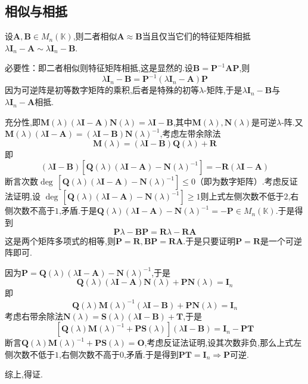 \subsection{相似与相抵}
\begin{formal}
\begin{theorem}[相似与相抵]\label{thm:相似与相抵}
    设$\bm{A},\bm{B}\in M_n\left(\mathbb{K}\right)$,则二者相似$\bm{A}\approx  \bm{B}$当且仅当它们的特征矩阵相抵$\lambda\bm{I}_n-\bm{A}\sim\lambda\bm{I}_n-\bm{B}.$
\end{theorem}
\begin{Proof}
必要性：即二者相似则特征矩阵相抵,这是显然的.设$\bm{B}=\bm{P}^{-1}\bm{AP}$,则\[
\lambda\bm{I}_n-\bm{B}=\bm{P}^{-1}\left(\lambda\bm{I}_n-\bm{A}\right)\bm{P}
\]因为可逆阵是初等数字矩阵的乘积,后者是特殊的初等$\lambda$-矩阵,于是$\lambda\bm{I}_n-\bm{B}$与$\lambda\bm{I}_n-\bm{A}$相抵.

充分性,即$\bm{M}\left(\lambda\right)\left(\lambda\bm{I}-\bm{A}\right)\bm{N}\left(\lambda\right)=\lambda\bm{I}-\bm{B}$,其中$\bm{M}\left(\lambda\right),\bm{N}\left(\lambda\right)$是可逆$\lambda$-阵.又
$\bm{M}\left(\lambda\right)\left(\lambda\bm{I}-\bm{A}\right)=\left(\lambda\bm{I}-\bm{B}\right)\bm{N}\left(\lambda\right)^{-1}$,考虑左带余除法\[
\bm{M}\left(\lambda\right)=\left(\lambda\bm{I}-\bm{B}\right)\bm{Q}\left(\lambda\right)+\bm{R}
\]即\[
\left(\lambda\bm{I}-\bm{B}\right)\left[
    \bm{Q}\left(\lambda\right)\left(\lambda\bm{I}-\bm{A}\right)-\bm{N}\left(\lambda\right)^{-1}
\right]=-\bm{R}\left(\lambda\bm{I}-\bm{A}\right)
\]断言次数$\deg\,\left[
    \bm{Q}\left(\lambda\right)\left(\lambda\bm{I}-\bm{A}\right)-\bm{N}\left(\lambda\right)^{-1}
\right]\leqslant 0$（即为数字矩阵）.考虑反证法证明,设
$\deg\,
\left[
    \bm{Q}\left(\lambda\right)\left(\lambda\bm{I}-\bm{A}\right)-\bm{N}\left(\lambda\right)^{-1}
\right]\geqslant 1
$则上式左侧次数不低于$2$,右侧次数不高于$1$,矛盾.于是$\bm{Q}\left(\lambda\right)\left(\lambda\bm{I}-\bm{A}\right)-\bm{N}\left(\lambda\right)^{-1}=-\bm{P}\in M_n\left(\mathbb{K}\right)$.于是得到
\[
\bm{P}\lambda-\bm{BP}=\bm{R}\lambda-\bm{RA}
\]这是两个矩阵多项式的相等,则$\bm{P}=\bm{R},\bm{BP}=\bm{RA}$.于是只要证明$\bm{P}=\bm{R}$是一个可逆阵即可.

因为$\bm{P}=
\bm{Q}\left(\lambda\right)\left(\lambda\bm{I}-\bm{A}\right)-\bm{N}\left(\lambda\right)^{-1}
$,于是
\[
\bm{Q}\left(\lambda\right)\left(\lambda\bm{I}-\bm{A}\right)\bm{N}\left(\lambda\right)+\bm{P}\bm{N}\left(\lambda\right)=\bm{I}_n
\]即
\[
\bm{Q}\left(\lambda\right)\bm{M}\left(\lambda\right)^{-1}\left(\lambda\bm{I}-\bm{B}\right)+\bm{P}\bm{N}\left(\lambda\right)=\bm{I}_n
\]考虑右带余除法$\bm{N}\left(\lambda\right)=\bm{S}\left(\lambda\right)\left(\lambda\bm{I}-\bm{B}\right)+\bm{T}$,于是
\[
\left[
    \bm{Q}\left(\lambda\right)\bm{M}\left(\lambda\right)^{-1}+\bm{PS}\left(\lambda\right)
\right]\left(\lambda\bm{I}-\bm{B}\right)=\bm{I}_n-\bm{PT}
\]断言$\bm{Q}\left(\lambda\right)\bm{M}\left(\lambda\right)^{-1}+\bm{PS}\left(\lambda\right)=\bm{O}$,考虑反证法证明,设其次数非负,那么上式左侧次数不低于$1$,右侧次数不高于$0$,矛盾.于是得到$\bm{PT}=\bm{I}_n\Longrightarrow \bm{P}$可逆.

综上,得证.
\end{Proof}
\end{formal}
\newpage
